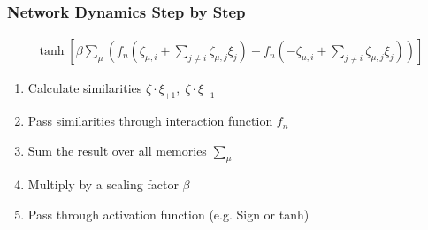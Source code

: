 \begin{frame}
    \frametitle{Network Dynamics Step by Step}
    \begin{gather*}
        \tanh \left[ \beta \sum_{\mu} \left( f_n \left(\zeta_{\mu, i} + \sum_{j \neq i} \zeta_{\mu, j} \xi_{j} \right) - f_n \left( -\zeta_{\mu, i} + \sum_{j \neq i} \zeta_{\mu, j} \xi_{j} \right) \right) \right]
    \end{gather*}

    \begin{enumerate}
        \item Calculate similarities \(\zeta \cdot \xi_{+1}, \; \zeta \cdot \xi_{-1}\)
        \item Pass similarities through interaction function \(f_n\)
        \item Sum the result over all memories \(\sum_\mu\)
        \item Multiply by a scaling factor \(\beta\)
        \item Pass through activation function (e.g. Sign or tanh)
    \end{enumerate}




\end{frame}

